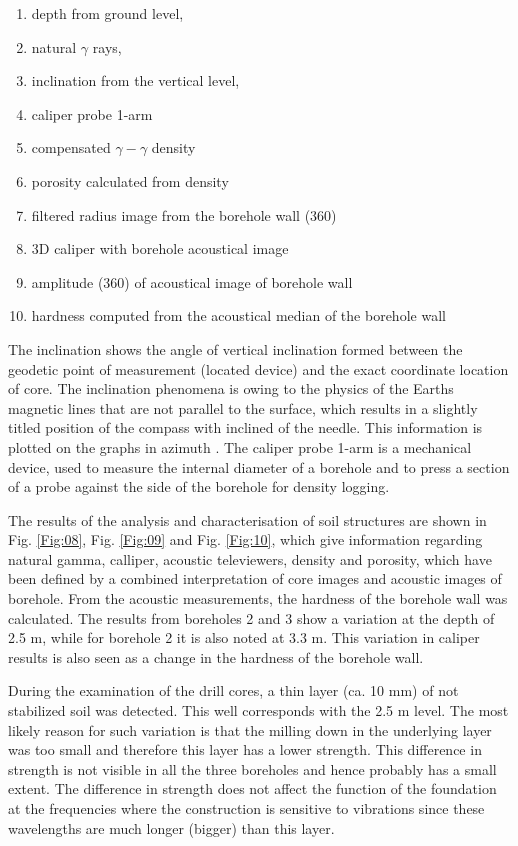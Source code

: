 \documentclass[USenglish,twocolumn]{article}
\begin{document}
\begin{enumerate}
	\item depth from ground level, 
	\item natural $\gamma$ rays, 
	\item inclination from the vertical level, 
	\item caliper probe 1-arm
	\item compensated $\gamma-\gamma$ density
	\item porosity calculated from density
	\item filtered radius image from the borehole wall (360\degree)
	\item 3D caliper with borehole acoustical image
	\item amplitude (360\degree) of acoustical image of borehole wall
	\item hardness computed from the acoustical median of the borehole wall
\end{enumerate}

The inclination shows the angle of vertical inclination formed between the geodetic point of measurement (located device) and the exact coordinate location of core. The inclination phenomena is owing to the physics of the Earths magnetic lines that are not parallel to the surface, which results in a slightly titled position of the compass with inclined of the needle. This information is plotted on the graphs in azimuth \degree. The caliper probe 1-arm is a mechanical device, used to measure the internal diameter of a borehole and to press a section of a probe against the side of the borehole for density logging.
	
The results of the analysis and characterisation of soil structures are shown in Fig. \ref{Fig:08}, Fig. \ref{Fig:09} and Fig. \ref{Fig:10}, which give information regarding natural gamma, calliper, acoustic televiewers, density and porosity, which have been defined by a combined interpretation of core images and acoustic images of borehole. From the acoustic measurements, the hardness of the borehole wall was calculated. The results from boreholes 2 and 3 show a variation at the depth of 2.5 m, while for borehole 2 it is also noted at 3.3 m. This variation in caliper results is also seen as a change in the hardness of the borehole wall. 

During the examination of the drill cores, a thin layer (ca. 10 mm) of not stabilized soil was detected. This well corresponds with the 2.5 m level. The most likely reason for such variation is that the milling down in the underlying layer was too small and therefore this layer has a lower strength. This difference in strength is not visible in all the three boreholes and hence probably has a small extent. The difference in strength does not affect the function of the foundation at the frequencies where the construction is sensitive to vibrations since these wavelengths are much longer (bigger) than this layer.
\end{document}
